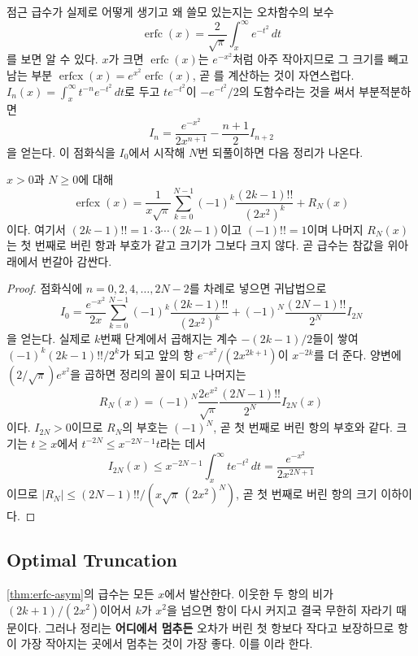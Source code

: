 점근 급수가 실제로 어떻게 생기고 왜 쓸모 있는지는 오차함수의 보수
\[
\operatorname{erfc}(x)=\frac{2}{\sqrt\pi}\int_x^\infty e^{-t^2}\,dt
\]
를 보면 알 수 있다. $x$가 크면 $\operatorname{erfc}(x)$는 $e^{-x^2}$처럼 아주 작아지므로 그 크기를 빼고 남는 부분 $\operatorname{erfcx}(x)=e^{x^2}\operatorname{erfc}(x)$, 곧 를 계산하는 것이 자연스럽다. $I_n(x)=\int_x^\infty t^{-n}e^{-t^2}\,dt$로 두고 $te^{-t^2}$이 $-e^{-t^2}/2$의 도함수라는 것을 써서 부분적분하면
\[
I_n=\frac{e^{-x^2}}{2x^{n+1}}-\frac{n+1}{2}I_{n+2}
\]
을 얻는다. 이 점화식을 $I_0$에서 시작해 $N$번 되풀이하면 다음 정리가 나온다.

\begin{theorem}
\label{thm:erfc-asym}
$x>0$과 $N\ge0$에 대해
\[
\operatorname{erfcx}(x)=\frac{1}{x\sqrt\pi}\sum_{k=0}^{N-1}(-1)^k\frac{(2k-1)!!}{(2x^2)^k}+R_N(x)
\]
이다. 여기서 $(2k-1)!!=1\cdot3\cdots(2k-1)$이고 $(-1)!!=1$이며 나머지 $R_N(x)$는 첫 번째로 버린 항과 부호가 같고 크기가 그보다 크지 않다. 곧 급수는 참값을 위아래에서 번갈아 감싼다.
\end{theorem}

\begin{proof}
점화식에 $n=0,2,4,\dots,2N-2$를 차례로 넣으면 귀납법으로
\[
I_0=\frac{e^{-x^2}}{2x}\sum_{k=0}^{N-1}(-1)^k\frac{(2k-1)!!}{(2x^2)^k}+(-1)^N\frac{(2N-1)!!}{2^N}I_{2N}
\]
을 얻는다. 실제로 $k$번째 단계에서 곱해지는 계수 $-(2k-1)/2$들이 쌓여 $(-1)^k(2k-1)!!/2^k$가 되고 앞의 항 $e^{-x^2}/(2x^{2k+1})$이 $x^{-2k}$를 더 준다. 양변에 $(2/\sqrt\pi)e^{x^2}$을 곱하면 정리의 꼴이 되고 나머지는
\[
R_N(x)=(-1)^N\frac{2e^{x^2}}{\sqrt\pi}\frac{(2N-1)!!}{2^N}I_{2N}(x)
\]
이다. $I_{2N}>0$이므로 $R_N$의 부호는 $(-1)^N$, 곧 첫 번째로 버린 항의 부호와 같다. 크기는 $t\ge x$에서 $t^{-2N}\le x^{-2N-1}t$라는 데서
\[
I_{2N}(x)\le x^{-2N-1}\int_x^\infty te^{-t^2}\,dt=\frac{e^{-x^2}}{2x^{2N+1}}
\]
이므로 $|R_N|\le(2N-1)!!/(x\sqrt\pi\,(2x^2)^N)$, 곧 첫 번째로 버린 항의 크기 이하이다.
\end{proof}

\subsection{Optimal Truncation}

\cref{thm:erfc-asym}의 급수는 모든 $x$에서 발산한다. 이웃한 두 항의 비가 $(2k+1)/(2x^2)$이어서 $k$가 $x^2$을 넘으면 항이 다시 커지고 결국 무한히 자라기 때문이다. 그러나 정리는 \textbf{어디에서 멈추든} 오차가 버린 첫 항보다 작다고 보장하므로 항이 가장 작아지는 곳에서 멈추는 것이 가장 좋다. 이를 이라 한다.

